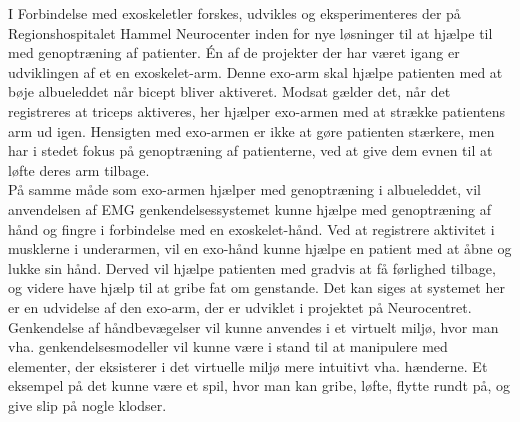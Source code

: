 I Forbindelse med exoskeletler forskes, udvikles og eksperimenteres der på Regionshospitalet Hammel Neurocenter inden for nye løsninger til at hjælpe til med genoptræning af patienter. Én af de projekter der har været igang er udviklingen af et en exoskelet-arm. Denne exo-arm skal hjælpe patienten med at bøje albueleddet når bicept bliver aktiveret. Modsat gælder det, når det registreres at triceps aktiveres, her hjælper exo-armen med at strække patientens arm ud igen. Hensigten med exo-armen er ikke at gøre patienten stærkere, men har i stedet fokus på genoptræning af patienterne, ved at give dem evnen til at løfte deres arm tilbage.\\

På samme måde som exo-armen hjælper med genoptræning i albueleddet, vil anvendelsen af EMG genkendelsessystemet kunne hjælpe med genoptræning af hånd og fingre i forbindelse med en exoskelet-hånd. Ved at registrere aktivitet i musklerne i underarmen, vil en exo-hånd kunne hjælpe en patient med at åbne og lukke sin hånd. Derved vil hjælpe patienten med gradvis at få førlighed tilbage, og videre have hjælp til at gribe fat om genstande. Det kan siges at systemet her er en udvidelse af den exo-arm, der er udviklet i projektet på Neurocentret. \\

Genkendelse af håndbevægelser vil kunne anvendes i et virtuelt miljø, hvor man vha.  genkendelsesmodeller vil kunne være i stand til at manipulere med elementer, der eksisterer i det virtuelle miljø mere intuitivt vha. hænderne. Et eksempel på det kunne være et spil, hvor man kan gribe, løfte, flytte rundt på, og give slip på nogle klodser.
